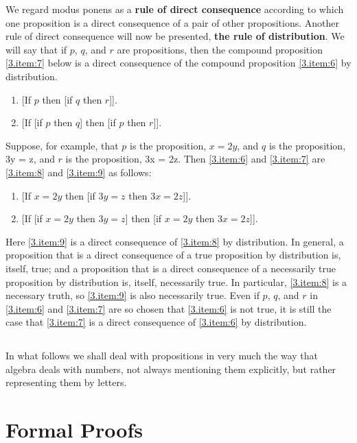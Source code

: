 \documentclass{book}
\begin{document}
We regard modus ponens as a \textbf{rule of direct consequence} according to which one proposition is a direct consequence of a pair of other propositions.  Another rule of direct consequence will now be presented, \textbf{the rule of distribution}.  We will say that if \(p\), \(q\), and \(r\) are propositions, then the compound proposition \ref{3.item:7} below is a direct consequence of the compound proposition \ref{3.item:6} by distribution.
\begin{enumerate}[resume*]
\item \label{3.item:6} [If \(p\) then [if \(q\) then \(r\)]].
\item \label{3.item:7} [If [if \(p\) then \(q\)] then [if \(p\) then \(r\)]].
\end{enumerate}
Suppose, for example, that \(p\) is the proposition, \(x = 2y\), and \(q\) is the proposition, 3y = z, and \(r\) is the proposition, 3x = 2z.  Then \ref{3.item:6} and \ref{3.item:7} are \ref{3.item:8} and \ref{3.item:9} as follows:
\begin{enumerate}[resume*]
\item \label{3.item:8} [If \(x = 2y\) then [if \(3y = z\) then \(3x = 2z\)]].
\item \label{3.item:9} [If [if \(x = 2y\) then \(3y = z\)] then [if \(x = 2y\) then \(3x = 2z\)]].
\end{enumerate}
Here \ref{3.item:9} is a direct consequence of \ref{3.item:8} by distribution.  In general, a proposition that is a direct consequence of a true proposition by distribution is, itself, true; and a proposition that is a direct consequence of a necessarily true proposition by distribution is, itself, necessarily true.  In particular, \ref{3.item:8} is a necessary truth, so \ref{3.item:9} is also necessarily true.  Even if \(p\), \(q\), and \(r\) in \ref{3.item:6} and \ref{3.item:7} are so chosen that \ref{3.item:6} is not true, it is still the case that \ref{3.item:7} is a direct consequence of \ref{3.item:6} by distribution.

\subsection{}
\label{sec:3.8}

In what follows we shall deal with propositions in very much the way that algebra deals with numbers, not always mentioning them explicitly, but rather representing them by letters.

\section{Formal Proofs}
\label{sec:4}
\end{document}
